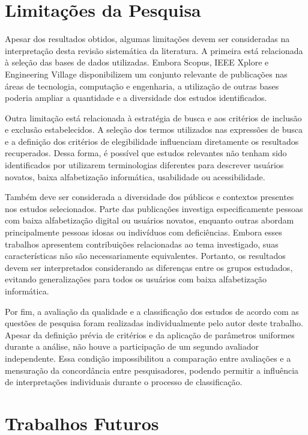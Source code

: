 \section{Limitações da Pesquisa}

Apesar dos resultados obtidos, algumas limitações devem ser consideradas na interpretação desta revisão sistemática da literatura. A primeira está relacionada à seleção das bases de dados utilizadas. Embora Scopus, IEEE Xplore e Engineering Village disponibilizem um conjunto relevante de publicações nas áreas de tecnologia, computação e engenharia, a utilização de outras bases poderia ampliar a quantidade e a diversidade dos estudos identificados.

Outra limitação está relacionada à estratégia de busca e aos critérios de inclusão e exclusão estabelecidos. A seleção dos termos utilizados nas expressões de busca e a definição dos critérios de elegibilidade influenciam diretamente os resultados recuperados. Dessa forma, é possível que estudos relevantes não tenham sido identificados por utilizarem terminologias diferentes para descrever usuários novatos, baixa alfabetização informática, usabilidade ou acessibilidade.

Também deve ser considerada a diversidade dos públicos e contextos presentes nos estudos selecionados. Parte das publicações investiga especificamente pessoas com baixa alfabetização digital ou usuários novatos, enquanto outras abordam principalmente pessoas idosas ou indivíduos com deficiências. Embora esses trabalhos apresentem contribuições relacionadas ao tema investigado, suas características não são necessariamente equivalentes. Portanto, os resultados devem ser interpretados considerando as diferenças entre os grupos estudados, evitando generalizações para todos os usuários com baixa alfabetização informática.

Por fim, a avaliação da qualidade e a classificação dos estudos de acordo com as questões de pesquisa foram realizadas individualmente pelo autor deste trabalho. Apesar da definição prévia de critérios e da aplicação de parâmetros uniformes durante a análise, não houve a participação de um segundo avaliador independente. Essa condição impossibilitou a comparação entre avaliações e a mensuração da concordância entre pesquisadores, podendo permitir a influência de interpretações individuais durante o processo de classificação.

\section{Trabalhos Futuros}

